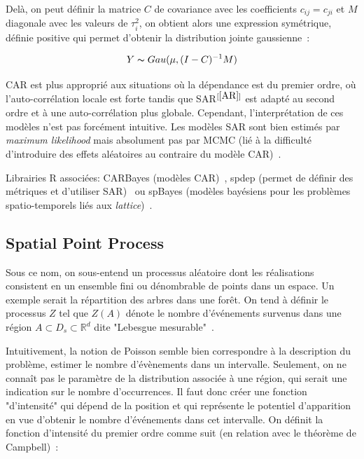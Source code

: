 Delà, on peut définir la matrice $C$ de covariance avec les coefficients $c_{ij} = c_{ji}$ et $M$ diagonale avec les valeurs de $\tau_{i}^{2}$, on obtient alors une expression symétrique, définie positive qui permet d'obtenir la distribution jointe gaussienne~\cite{besag1974spatial}:

\begin{equation}
    Y \thicksim Gau(\mu, (I - C)^{-1}M)
\end{equation}

CAR est plus approprié aux situations où la dépendance est du premier ordre, où l'auto-corrélation locale est forte tandis que SAR$^{[\ref{AR}]}$ est adapté au second ordre et à une auto-corrélation plus globale. Cependant, l'interprétation de ces modèles n'est pas forcément intuitive. Les modèles SAR sont bien estimés par \textit{maximum likelihood} mais absolument pas par MCMC (lié à la difficulté d'introduire des effets aléatoires au contraire du modèle CAR)~\cite{wall2004close}.

Librairies R associées: CARBayes (modèles CAR)~\cite{CarBayes}, spdep (permet de définir des métriques et d'utiliser SAR)~\cite{spdep} ou spBayes (modèles bayésiens pour les problèmes spatio-temporels liés aux \textit{lattice})~\cite{finley2007spbayes}.

\subsection{Spatial Point Process}\label{Variation_ponctuelle}

Sous ce nom, on sous-entend un processus aléatoire dont les réalisations consistent en un ensemble fini ou dénombrable de points dans un espace. Un exemple serait la répartition des arbres dans une forêt. On tend à définir le processus $Z$ tel que $Z(A)$ dénote le nombre d'événements survenus dans une région $A \subset D_{s} \subset \mathbb{R}^{d}$ dite "Lebesgue mesurable"~\cite{daley2007introduction}.

Intuitivement, la notion de Poisson semble bien correspondre à la description du problème, estimer le nombre d'évènements dans un intervalle. Seulement, on ne connaît pas le paramètre de la distribution associée à une région, qui serait une indication sur le nombre d'occurrences. Il faut donc créer une fonction "d'intensité" qui dépend de la position et qui représente le potentiel d'apparition en vue d'obtenir le nombre d'événements dans cet intervalle. On définit la fonction d'intensité du premier ordre comme suit (en relation avec le théorème de Campbell)~\cite{baddeley2007spatial}:

